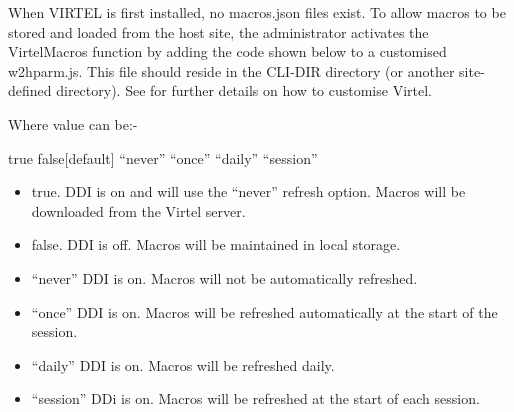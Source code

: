 \documentclass[letterpaper,10pt,english]{sphinxmanual}
\begin{document}

When VIRTEL is first installed, no macros.json files exist. To allow macros to be stored and loaded from the host site, the administrator activates the VirtelMacros function by
adding the code shown below to a customised w2hparm.js. This file should reside in the CLI-DIR directory (or another site-defined directory). See {\hyperref[\detokenize{User_Guide:v457ug-customizing-with-option}]{}} for further details on how to customise Virtel.

\begin{sphinxVerbatim}[commandchars=\\\{\}]
  
     
\end{sphinxVerbatim}

Where value can be:-

\begin{sphinxVerbatim}[commandchars=\\\{\}]
true \textbar{} false[default] \textbar{} “never” \textbar{} “once” \textbar{} “daily” \textbar{} “session”
\end{sphinxVerbatim}
\begin{itemize}
\item {} 
true.      DDI is on and will use the “never” refresh option. Macros will be downloaded from the Virtel server.

\item {} 
false.     DDI is off. Macros will be maintained in local storage.

\item {} 
“never”    DDI is on. Macros will not be automatically refreshed.

\item {} 
“once”     DDI is on. Macros will be refreshed automatically at the start of the session.

\item {} 
“daily”    DDI is on. Macros will be refreshed daily.

\item {} 
“session”  DDi is on. Macros will be refreshed at the start of each session.

\end{itemize}
\end{document}
